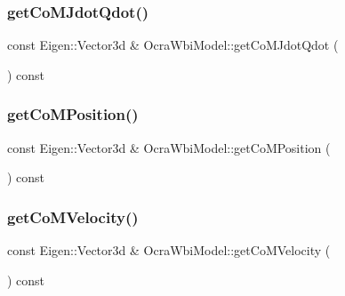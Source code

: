 \hypertarget{classocra__icub_1_1OcraWbiModel_a38ee68461d9c5d6fccd876321fb0163a}{}\label{classocra__icub_1_1OcraWbiModel_a38ee68461d9c5d6fccd876321fb0163a} 
\subsubsection{\texorpdfstring{get\+Co\+M\+Jdot\+Qdot()}{getCoMJdotQdot()}}
{\footnotesize\ttfamily const Eigen\+::\+Vector3d \& Ocra\+Wbi\+Model\+::get\+Co\+M\+Jdot\+Qdot (\begin{DoxyParamCaption}{ }\end{DoxyParamCaption}) const\hspace{0.3cm}{\ttfamily [virtual]}}

\hypertarget{classocra__icub_1_1OcraWbiModel_ac7f1d9d4677358db4c0c34ade2f645bd}{}\label{classocra__icub_1_1OcraWbiModel_ac7f1d9d4677358db4c0c34ade2f645bd} 
\subsubsection{\texorpdfstring{get\+Co\+M\+Position()}{getCoMPosition()}}
{\footnotesize\ttfamily const Eigen\+::\+Vector3d \& Ocra\+Wbi\+Model\+::get\+Co\+M\+Position (\begin{DoxyParamCaption}{ }\end{DoxyParamCaption}) const\hspace{0.3cm}{\ttfamily [virtual]}}

\hypertarget{classocra__icub_1_1OcraWbiModel_a08a0b1a4be74a6456162d60e38d470cd}{}\label{classocra__icub_1_1OcraWbiModel_a08a0b1a4be74a6456162d60e38d470cd} 
\subsubsection{\texorpdfstring{get\+Co\+M\+Velocity()}{getCoMVelocity()}}
{\footnotesize\ttfamily const Eigen\+::\+Vector3d \& Ocra\+Wbi\+Model\+::get\+Co\+M\+Velocity (\begin{DoxyParamCaption}{ }\end{DoxyParamCaption}) const\hspace{0.3cm}{\ttfamily [virtual]}}

